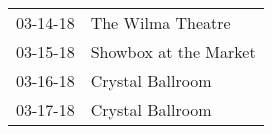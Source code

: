 \begin{supertabular}{p{0.25\columnwidth}p{0.75\columnwidth}}
 03-14-18 &      The Wilma Theatre \\
 03-15-18 &  Showbox at the Market \\
 03-16-18 &       Crystal Ballroom \\
 03-17-18 &       Crystal Ballroom \\
\end{supertabular}
